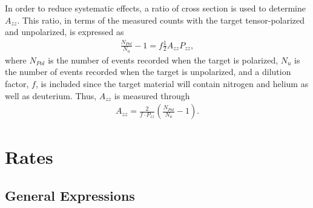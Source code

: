 \documentclass[11pt]{article}
\begin{document}
In order to reduce systematic effects, a ratio of cross section is used to determine $A_{zz}$. This ratio, in terms of the measured counts with the target tensor-polarized and unpolarized, is expressed as
\begin{eqnarray}
\frac{N_{Pol}}{N_{u}} - 1 = f \frac{1}{2} A_{zz}  P_{zz},
\end{eqnarray}
where $N_{Pol}$ is the number of events recorded when the target is polarized, $N_u$ is the number of events recorded when the target is unpolarized, and a dilution factor, $f$, is included since the target material will contain nitrogen and helium as well as deuterium. Thus, $A_{zz}$ is measured through
\begin{eqnarray}A_{zz} = \frac{2  }{f \cdot P_{zz}}\left( \frac{N_{Pol}}{N_{u}} - 1 \right).
\end{eqnarray}

\section{Rates}
\label{rates-sec}
\subsection{General Expressions}
\end{document}
